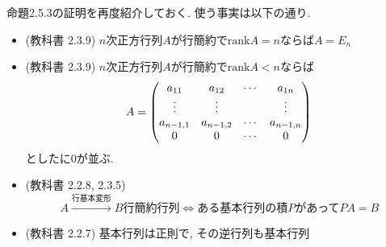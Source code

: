 \documentclass[dvipdfmx,a4paper,11pt]{article} %
\theoremstyle{definition}
\begin{document}
命題2.5.3の証明を再度紹介しておく. 使う事実は以下の通り. 
\begin{itemize}
\item (教科書 2.3.9) $n$次正方行列$A$が行簡約で$\mathrm{rank}A=n$ならば$A=E_n$
\item (教科書 2.3.9) $n$次正方行列$A$が行簡約で$\mathrm{rank}A<n$ならば
$$A=
\begin{pmatrix}
a_{11} & a_{12} & \cdots & a_{1n} \\
\vdots & \vdots & & \vdots \\
a_{n-1,1} & a_{n-1,2} & \cdots & a_{n-1,n} \\
0& 0 & \cdots & 0
\end{pmatrix}\\
$$
としたに0が並ぶ. 
\item (教科書 2.2.8, 2.3.5) 
$$
A\overset{\text{行基本変形}}{\longrightarrow} B \text{行簡約行列}
\Leftrightarrow 
\text{ある基本行列の積$P$があって}
PA=B
$$
\item (教科書 2.2.7) 基本行列は正則で, その逆行列も基本行列
\end{itemize}
\end{document}
